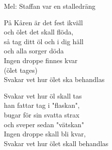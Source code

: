 \begin{SongText}[Ölvisa]
    \begin{SongInfo}
        Mel: Staffan var en stalledräng
    \end{SongInfo}
    \begin{SongVerse}
        På Kåren är det fest ikväll\\%
        och ölet det skall flöda,\\%
        så tag ditt öl och i dig häll\\%
        och alla sorger döda\\%
        Ingen droppe finnes kvar\\%
        (ölet tages)\\%
        Svakar vet hur ölet ska behandlas
    \end{SongVerse}
    \begin{SongVerse}
        Svakar vet hur öl skall tas\\%
        han fattar tag i "flaskan",\\%
        bugar för sin svatta strax\\%
        och sveper sedan "vätskan"\\%
        Ingen droppe skall bli kvar,\\%
        Svakar vet hur ölet skall behandlas
    \end{SongVerse}
\end{SongText}
